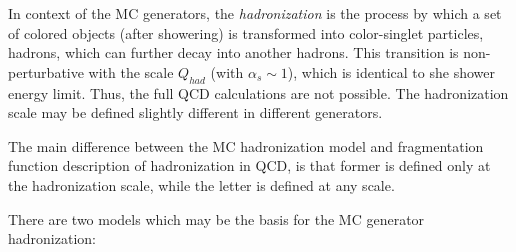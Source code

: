 In context of the MC generators, the \textit{hadronization} is the process by which a set of colored objects (after showering)
is transformed into color-singlet particles, hadrons, which can further decay into another hadrons. This transition is non-perturbative
with the scale $Q_{had}$ (with $\alpha_{s} \sim 1$), which is identical to she shower energy limit. Thus, the full QCD calculations
are not possible. The hadronization scale may be defined slightly different in different generators.

The main difference between the MC hadronization model and fragmentation function description of hadronization in QCD, is that former
is defined only at the hadronization scale, while the letter is defined at any scale.

There are two models which may be the basis for the MC generator hadronization:

